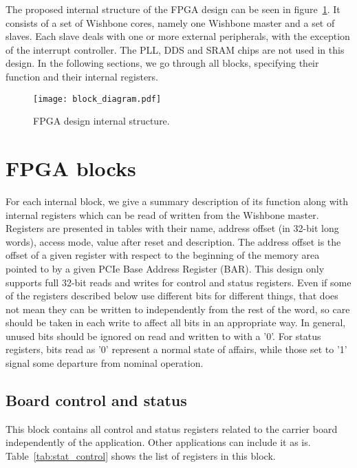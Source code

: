 \documentclass{article}
\begin{document}
The proposed internal structure of the FPGA design can be seen in figure~\ref{fig:block_diagram}. It consists of a set of Wishbone cores, namely one Wishbone master and a set of slaves. Each slave deals with one or more external peripherals, with the exception of the interrupt controller. The PLL, DDS and SRAM chips are not used in this design. In the following sections, we go through all blocks, specifying their function and their internal registers.

\begin{figure}[htbp]
  \centering
  \texttt{[image: block\_diagram.pdf]}
  \caption{FPGA design internal structure.}
  \label{fig:block_diagram}
\end{figure}

\section{FPGA blocks}
For each internal block, we give a summary description of its function along with internal registers which can be read of written from the Wishbone master. Registers are presented in tables with their name, address offset (in 32-bit long words), access mode, value after reset and description. The address offset is the offset of a given register with respect to the beginning of the memory area pointed to by a given PCIe Base Address Register (BAR). This design only supports full 32-bit reads and writes for control and status registers. Even if some of the registers described below use different bits for different things, that does not mean they can be written to independently from the rest of the word, so care should be taken in each write to affect all bits in an appropriate way. In general, unused bits should be ignored on read and written to with a '0'. For status registers, bits read as '0' represent a normal state of affairs, while those set to '1' signal some departure from nominal operation.

\subsection{Board control and status}
This block contains all control and status registers related to the carrier board independently of the application. Other applications can include it as is. Table~\ref{tab:stat_control} shows the list of registers in this block.
\end{document}
